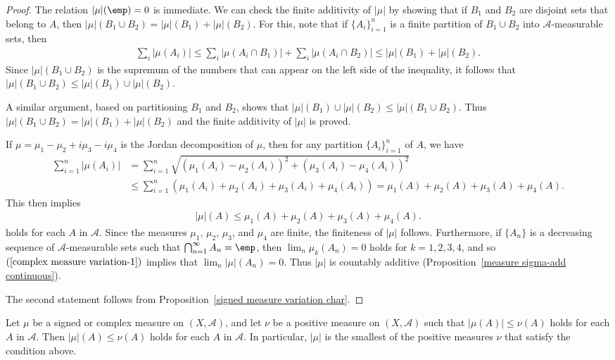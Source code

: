 \begin{proof}
The relation $|\mu|(\emp)=0$ is immediate. We can check the finite additivity of $|\mu|$ by showing that if $B_1$ and $B_2$ are disjoint sets that belong to $A$, then $|\mu|(B_1\cup B_2)=|\mu|(B_1)+|\mu|(B_2)$. For this, note that if $\{A_i\}_{i=1}^{n}$ is a finite partition of $B_1\cup B_2$ into $\mathcal{A}$-measurable sets, then
\begin{align*}
\sum_{i}|\mu(A_i)|\leq\sum_{i}|\mu(A_i\cap B_1)|+\sum_{i}|\mu(A_i\cap B_2)|\leq|\mu|(B_1)+|\mu|(B_2).
\end{align*}
Since $|\mu|(B_1\cup B_2)$ is the supremum of the numbers that can appear on the left side of the inequality, it follows that $|\mu|(B_1\cup B_2)\leq|\mu|(B_1)\cup|\mu|(B_2)$.\par
A similar argument, based on partitioning $B_1$ and $B_2$, shows that $|\mu|(B_1)\cup|\mu|(B_2)\leq|\mu|(B_1\cup B_2)$. Thus $|\mu|(B_1\cup B_2)=|\mu|(B_1)+|\mu|(B_2)$ and the finite additivity of $|\mu|$ is proved.\par
If $\mu=\mu_1-\mu_2+i\mu_3-i\mu_4$ is the Jordan decomposition of $\mu$, then for any partition $\{A_i\}_{i=1}^{n}$ of $A$, we have
\begin{align*}
\sum_{i=1}^{n}|\mu(A_i)|&=\sum_{i=1}^{n}\sqrt{(\mu_1(A_i)-\mu_2(A_i))^2+(\mu_3(A_i)-\mu_4(A_i))^2}\\
&\leq\sum_{i=1}^{n}(\mu_1(A_i)+\mu_2(A_i)+\mu_3(A_i)+\mu_4(A_i))=\mu_1(A)+\mu_2(A)+\mu_3(A)+\mu_4(A).
\end{align*}
This then implies
\begin{align}\label{complex measure variation-1}
|\mu|(A)\leq\mu_1(A)+\mu_2(A)+\mu_3(A)+\mu_4(A).
\end{align}
holds for each $A$ in $\mathcal{A}$. Since the measures $\mu_1$, $\mu_2$, $\mu_3$, and $\mu_4$ are finite, the finiteness of $|\mu|$ follows. Furthermore, if $\{A_n\}$ is a decreasing sequence of $\mathcal{A}$-measurable sets such that $\bigcap_{n=1}^{\infty}A_n=\emp$, then $\lim_n\mu_k(A_n)=0$ holds for $k=1,2,3,4$, and so $(\ref{complex measure variation-1})$ implies that $\lim_n|\mu|(A_n)=0$. Thus $|\mu|$ is countably additive (Proposition~\ref{measure sigma-add continuous}).\par
The second statement follows from Proposition~\ref{signed measure variation char}.
\end{proof}
\begin{proposition}\label{variation is smallest positive}
Let $\mu$ be a signed or complex measure on $(X,\mathcal{A})$, and let $\nu$ be a positive measure on $(X,\mathcal{A})$ such that $|\mu(A)|\leq\nu(A)$ holds for each $A$ in $\mathcal{A}$. Then $|\mu|(A)\leq\nu(A)$ holds for each $A$ in $\mathcal{A}$. In particular, $|\mu|$ is the smallest of the positive measures $\nu$ that satisfy the condition above.
\end{proposition}
